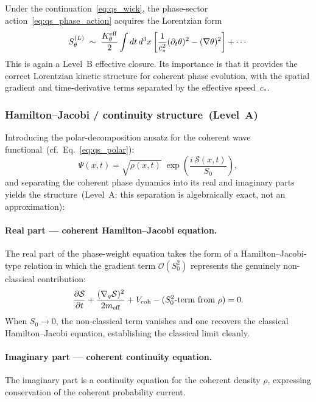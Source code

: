 Under the continuation~\eqref{eq:qs_wick}, the phase-sector
action~\eqref{eq:qs_phase_action} acquires the Lorentzian form
\begin{equation}
  \label{eq:qs_phase_action_L}
  S_\theta^{(L)}
  \;\sim\;
  \frac{K_\theta^{\rm eff}}{2}
  \int dt\,d^3x
  \left[
    \frac{1}{c_*^2}(\partial_t\theta)^2
    - (\nabla\theta)^2
  \right]
  + \cdots
\end{equation}
This is again a Level~B effective closure.
Its importance is that it provides the correct Lorentzian kinetic
structure for coherent phase evolution, with the spatial gradient and
time-derivative terms separated by the effective speed~$c_*$.

\subsubsection*{Hamilton--Jacobi / continuity structure~(Level~A)}

Introducing the polar-decomposition ansatz for the coherent wave
functional~(cf.~Eq.~\eqref{eq:qs_polar}):
\begin{equation}
  \label{eq:qs_wave_ansatz}
  \Psi(x,t)
  =
  \sqrt{\rho(x,t)}\;
  \exp\!\left(\frac{i\,\mathcal{S}(x,t)}{S_0}\right),
\end{equation}
and separating the coherent phase dynamics into its real and imaginary
parts yields the structure~(Level~A: this separation is algebraically
exact, not an approximation):

\paragraph{Real part --- coherent Hamilton--Jacobi equation.}
The real part of the phase-weight equation takes the form of a
Hamilton--Jacobi-type relation in which the gradient term
$\mathcal{O}(S_0^2)$ represents the genuinely non-classical
contribution:
\begin{equation}
  \label{eq:qs_HJ_structure}
  \frac{\partial\mathcal{S}}{\partial t}
  +
  \frac{(\nabla_q\mathcal{S})^2}{2m_{\rm eff}}
  + V_{\rm coh}
  - (S_0^2\text{-term from } \rho)
  = 0.
\end{equation}
When $S_0\to0$, the non-classical term vanishes and one recovers the
classical Hamilton--Jacobi equation, establishing the classical limit
cleanly.

\paragraph{Imaginary part --- coherent continuity equation.}
The imaginary part is a continuity equation for the coherent density
$\rho$, expressing conservation of the coherent probability current.

